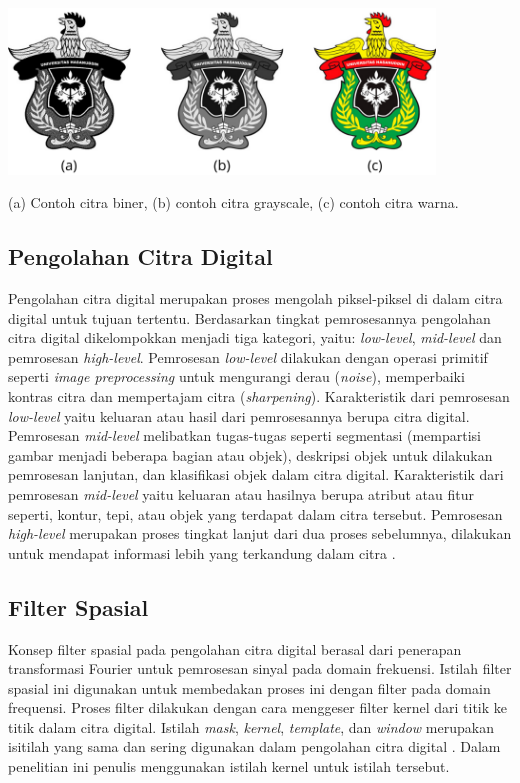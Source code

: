 \begin{afigure}
    \includegraphics[width=0.85\textwidth, center]{images/jenis-jenis-citra.png}
    \caption{(a) Contoh citra biner, (b) contoh citra grayscale, (c) contoh citra warna.}
    \label{fig:jenis-citra}
\end{afigure}


\subsection{Pengolahan Citra Digital}
Pengolahan citra digital merupakan proses mengolah piksel-piksel di dalam citra digital untuk tujuan tertentu. Berdasarkan tingkat pemrosesannya pengolahan citra digital dikelompokkan menjadi tiga kategori, yaitu: \textit{low-level}, \textit{mid-level} dan pemrosesan \textit{high-level}. Pemrosesan \textit{low-level} dilakukan dengan operasi primitif seperti \textit{image preprocessing} untuk mengurangi derau (\textit{noise}), memperbaiki kontras citra dan mempertajam citra (\textit{sharpening}). Karakteristik dari pemrosesan \textit{low-level} yaitu keluaran atau hasil dari pemrosesannya berupa citra digital. Pemrosesan \textit{mid-level} melibatkan tugas-tugas seperti segmentasi (mempartisi gambar menjadi beberapa bagian atau objek), deskripsi objek untuk dilakukan pemrosesan lanjutan, dan klasifikasi objek dalam citra digital. Karakteristik dari pemrosesan \textit{mid-level} yaitu keluaran atau hasilnya berupa atribut atau fitur seperti, kontur, tepi, atau objek yang terdapat dalam citra tersebut. Pemrosesan \textit{high-level} merupakan proses tingkat lanjut dari dua proses sebelumnya, dilakukan untuk mendapat informasi lebih yang terkandung dalam citra .

\subsection{Filter Spasial}
Konsep filter spasial pada pengolahan citra digital berasal dari penerapan transformasi Fourier untuk pemrosesan sinyal pada domain frekuensi. Istilah filter spasial ini digunakan untuk membedakan proses ini dengan filter pada domain frequensi. Proses filter dilakukan dengan cara menggeser filter kernel dari titik ke titik dalam citra digital. Istilah \textit{mask}, \textit{kernel}, \textit{template}, dan \textit{window} merupakan isitilah yang sama dan sering digunakan dalam pengolahan citra digital . Dalam penelitian ini penulis menggunakan istilah kernel untuk istilah tersebut.


